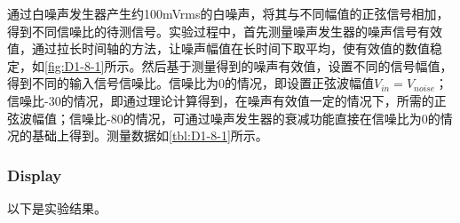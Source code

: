 \begin{enumerate}
	通过白噪声发生器产生约100mVrms的白噪声，将其与不同幅值的正弦信号相加，得到不同信噪比的待测信号。实验过程中，首先测量噪声发生器的噪声信号有效值，通过拉长时间轴的方法，让噪声幅值在长时间下取平均，使有效值的数值稳定，如\cref{fig:D1-8-1}所示。然后基于测量得到的噪声有效值，设置不同的信号幅值，得到不同的输入信号信噪比。信噪比为0的情况，即设置正弦波幅值$V_{in} = V_{noise}$；信噪比-30的情况，即通过理论计算得到，在噪声有效值一定的情况下，所需的正弦波幅值；信噪比-80的情况，可通过噪声发生器的衰减功能直接在信噪比为0的情况的基础上得到。测量数据如\cref{tbl:D1-8-1}所示。
	
\end{enumerate}	

\clearpage
\subsubsection{Display}
以下是实验结果。

